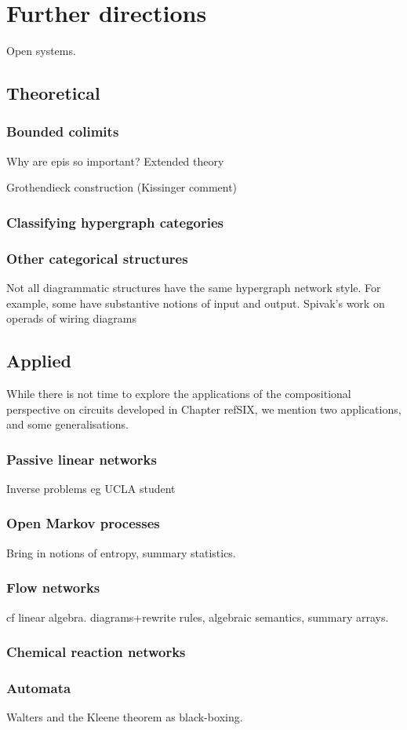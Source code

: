 \chapter{Further directions}

Open systems. 

\section{Theoretical}
\subsection{Bounded colimits}
Why are epis so important? Extended theory

Grothendieck construction (Kissinger comment)

\subsection{Classifying hypergraph categories}


\subsection{Other categorical structures}
Not all diagrammatic structures have the same hypergraph network style. For
example, some have substantive notions of input and output. Spivak's work on
operads of wiring diagrams 


\section{Applied}
While there is not time to explore the applications of the compositional
perspective on circuits developed in Chapter refSIX, we mention two
applications, and some generalisations.
\subsection{Passive linear networks}
  Inverse problems eg UCLA student 

\subsection{Open Markov processes}
Bring in notions of entropy, summary statistics. 

\subsection{Flow networks}
cf linear algebra. diagrams+rewrite rules, algebraic semantics, summary arrays.



\subsection{Chemical reaction networks}


\subsection{Automata}
Walters and the Kleene theorem as black-boxing.
